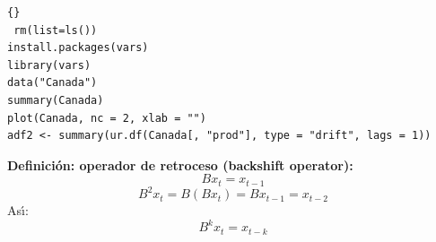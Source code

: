 \begin{lstlisting}[title={‘Código R: ejemplo Modelo VAR},basicstyle=\ttfamily]{}
 rm(list=ls())
install.packages(vars)
library(vars)
data("Canada")
summary(Canada)
plot(Canada, nc = 2, xlab = "")
adf2 <- summary(ur.df(Canada[, "prod"], type = "drift", lags = 1))
\end{lstlisting}


\begin{figure}[H]
	\centering
	\textbf{}\par\medskip
	\caption{}\label{figxx}
\end{figure}

\begin{mdframed}[style=MyFrame]
\begin{definition}\label{def}
	\textbf{Definici\'on: operador de retroceso (backshift operator):}
		\begin{equation}
		B x_t = x_{t-1} 
		\end{equation}
		\begin{equation}
		B^2 x_t =  B(B x_t) = B x_{t-1} = x_{t-2}
		\end{equation}
		As\'{\i}:
		\begin{equation}
		B^k x_t = x_{t-k} 
		\end{equation} 
\end{definition}
\end{mdframed}
